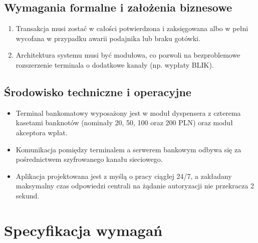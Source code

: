\documentclass[12pt]{article}
\begin{document}
\subsection{Wymagania formalne i założenia biznesowe}
\begin{enumerate}
    \item Transakcja musi zostać w całości potwierdzona i zaksięgowana albo w pełni wycofana w przypadku awarii podajnika lub braku gotówki.
    \item Architektura systemu musi być modułowa, co pozwoli na bezproblemowe rozszerzenie terminala o dodatkowe kanały (np. wypłaty BLIK).
\end{enumerate}

\subsection{Środowisko techniczne i operacyjne}
\begin{itemize}
    \item Terminal bankomatowy wyposażony jest w moduł dyspensera z czterema kasetami banknotów (nominały 20, 50, 100 oraz 200 PLN) oraz moduł akceptora wpłat.
    \item Komunikacja pomiędzy terminalem a serwerem bankowym odbywa się za pośrednictwem szyfrowanego kanału sieciowego.
    \item Aplikacja projektowana jest z myślą o pracy ciągłej 24/7, a zakładany maksymalny czas odpowiedzi centrali na żądanie autoryzacji nie przekracza 2 sekund.
\end{itemize}

\newpage

\section{Specyfikacja wymagań}
\end{document}
